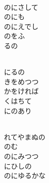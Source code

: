 \documentclass[10pt,b5j]{tarticle} %
\begin{document}
\vspace{1.5em} %
\newcommand{\linespace}{0.5em} %
\newcommand{\blocksize}{0.5\hsize} %
\newcommand{\itemmargin}{3em} %
\begin{enumerate} %
    \setlength{\itemindent}{\itemmargin} %
    \begin{minipage}[c]{\blocksize}
    
        \vspace{\linespace}
        \item~\\
        のにさして\\
        のにも\\
        のにえでし\\
        のをふ\\
        るの
        
    \end{minipage}
    \begin{minipage}[c]{\blocksize}
        
        \vspace{\linespace}
        \item~\\
        にるの\\
        きをめつつ\\
        かをければ\\
        くはちて\\
        にのあり
        
    \end{minipage}
    \begin{minipage}[c]{\blocksize}
        
        \vspace{\linespace}
        \item~\\
        れてやまぬの\\
        のむ\\
        のにみつつ\\
        にひしの\\
        のにゆるかな
        

\end{minipage}
\end{enumerate}
\end{document}
